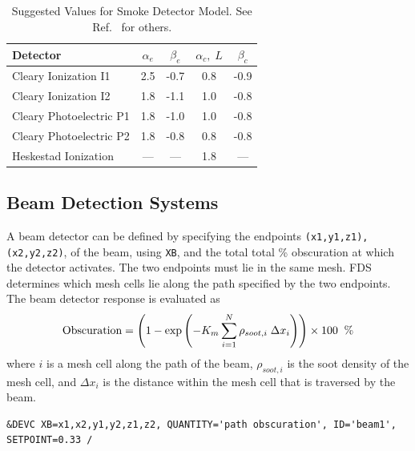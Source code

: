 \documentclass[11pt]{book}
\newcommand{\ct}{\tt\small}
\newcommand{\be}{\begin{equation}}
\newcommand{\ee}{\end{equation}}
\begin{document}
\begin{table}[ht]
\caption{Suggested Values for Smoke Detector Model. See Ref.~\cite{SFPE} for others.}
\vspace{0.1in}
\label{tab:sdvalues}
\begin{center}
\begin{tabular}{|l||c|c|c|c|}
\hline
Detector                      & $\alpha_e$  &  $\beta_e$   &  $\alpha_c, \; L$   &  $\beta_c$  \\ \hline \hline
Cleary Ionization    I1       & 2.5         & -0.7         &  0.8                &  -0.9      \\ \hline
Cleary Ionization    I2       & 1.8         & -1.1         &  1.0                &  -0.8      \\ \hline
Cleary Photoelectric P1       & 1.8         & -1.0         &  1.0                &  -0.8      \\ \hline
Cleary Photoelectric P2       & 1.8         & -0.8         &  0.8                &  -0.8      \\ \hline
Heskestad Ionization          & ---         & ---          &  1.8                &  ---       \\ \hline\end{tabular}
\end{center}
\end{table}


\subsection{Beam Detection Systems}
\label{info:beam_detector}

A beam detector can be defined by specifying the endpoints {\ct (x1,y1,z1),(x2,y2,z2)}, of the beam, using {\ct XB}, and the total
total \% obscuration at which the detector activates.  The two endpoints must lie in the same mesh.  FDS determines which mesh
cells lie along the path specified by the two endpoints.  The beam detector response is evaluated as
\be
  \hbox{Obscuration}  = \left(1 - \exp \left( -K_m \sum_{i=1}^N {\rho_{soot,i}\; \Delta x_i} \right)  \right) \times 100  \; \; \hbox{\%}
\ee
where $i$ is a mesh cell along the path of the beam, $\rho_{soot,i}$ is the soot density of the mesh cell, and $ \Delta x_i$
is the distance within the mesh cell that is traversed by the beam.

\footnotesize
\begin{verbatim}
&DEVC XB=x1,x2,y1,y2,z1,z2, QUANTITY='path obscuration', ID='beam1', SETPOINT=0.33 /
\end{verbatim}
\normalsize
\end{document}
